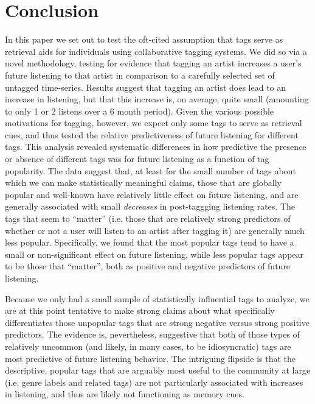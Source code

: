 \section{Conclusion}
\label{sec_conclusion}


In this paper we set out to test the oft-cited assumption that tags serve as retrieval aids for individuals using collaborative tagging systems.  We did so via a novel methodology, testing for evidence that tagging an artist increases a user's future listening to that artist in comparison to a carefully selected set of untagged time-series. Results suggest that tagging an artist does lead to an increase in listening, but that this increase is, on average, quite small (amounting to only 1 or 2 listens over a 6 month period). Given the various possible motivations for tagging, however, we expect only some tags to serve as retrieval cues, and thus tested the relative predictiveness of future listening for different tags. This analysis revealed systematic differences in how predictive the presence or absence of different tags was for future listening as a function of tag popularity. The data suggest that, at least for the small number of tags about which we can make statistically meaningful claims, those that are globally popular and well-known have relatively little effect on future listening, and are generally associated with small \emph{decreases} in post-taggging listening rates. The tags that seem to ``matter'' (i.e. those that are relatively strong predictors of whether or not a user will listen to an artist after tagging it) are generally much less popular. Specifically, we found that the most popular tags tend to have a small or non-significant effect on future listening, while less popular tags appear to be those that ``matter'', both as positive and negative predictors of future listening.

Because we only had a small sample of statistically influential tags to analyze, we are at this point tentative to make strong claims about what specifically differentiates those unpopular tags that are strong negative versus strong positive predictors. The evidence is, nevertheless, suggestive that both of those types of relatively uncommon (and likely, in many cases, to be idiosyncratic) tags are most predictive of future listening behavior. The intriguing flipside is that the descriptive, popular tags that are arguably most useful to the community at large (i.e. genre labels and related tags) are not particularly associated with increases in listening, and thus are likely not functioning as memory cues.

